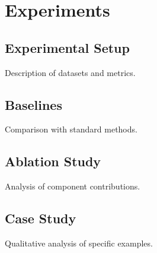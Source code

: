 
\section{Experiments}
\subsection{Experimental Setup}
Description of datasets and metrics.

\subsection{Baselines}
Comparison with standard methods.

\subsection{Ablation Study}
Analysis of component contributions.

\subsection{Case Study}
Qualitative analysis of specific examples.
